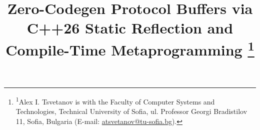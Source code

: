 \documentclass[conference,a4paper]{IEEEtran}
\begin{document}

\title{{\fontsize{21}{14.4}\selectfont
Zero-Codegen Protocol Buffers via C++26 Static Reflection and Compile-Time Metaprogramming}%
\thanks{\textsuperscript{1}Alex I. Tsvetanov is with the Faculty of Computer Systems and Technologies, Technical University of Sofia, ul. Professor Georgi Bradistilov 11, Sofia, Bulgaria (E-mail: \href{mailto:atsvetanov@tu-sofia.bg}{atsvetanov@tu-sofia.bg}).}%
}

\author{
}

\maketitle

\setcounter{page}{1}
\renewcommand{\headrulewidth}{0pt}
\renewcommand{\footrulewidth}{0pt}
\thispagestyle{fancy}
    \fancyfoot[C]{\thepage}
\end{document}

